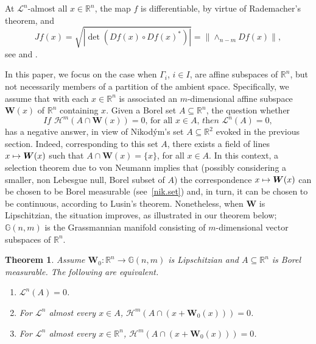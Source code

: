 \documentclass[11pt]{article}
\theoremstyle{definition}
\theoremstyle{jepanonymous}
\theoremstyle{plain}
\newcommand\mto{\mathchoice{\longmapsto}{\mapsto}{\mapsto}{\mapsto}}
\newtheorem*{Theorem*}{Theorem}
\newcommand{\R}{\mathbb{R}}
\newcommand{\Rn}{\R^n}
\newcommand{\calH}{\mathscr{H}}
\newcommand{\calL}{\mathscr{L}}
\newcommand{\bW}{{\boldsymbol{W}}}
\newcommand{\bG}{\mathbb{G}}
\let\subset\subseteq
\begin{document}
At $\calL^n$-almost all $x \in \Rn$, the map $f$ is differentiable, by virtue of Rademacher's theorem, and
\begin{equation*}
Jf(x) = \sqrt{ \left| \det \left(Df(x) \circ Df(x)^*\right)\right|} =\| {\wedge}_{n-m} Df(x)\|,
\end{equation*}
see \cite[Chap.\,3, \S 4]{EVANS.GARIEPY} and \cite[3.2.1 \& 3.2.11]{GMT}.
\par
In this paper, we focus on the case when $\Gamma_i$, $i \in I$, are affine subspaces of $\Rn$, but not necessarily members of a partition of the ambient space.
Specifically, we assume that with each $x \in \Rn$ is associated an $m$-dimensional affine subspace $\bW(x)$ of $\Rn$ containing $x$.
Given a Borel set $A \subset \Rn$, the question whether
\begin{equation}
\label{eq.1}
\textit{If } \calH^m(A \cap \bW(x))=0 \text{, for all } x \in A \textit{, then } \calL^n(A)=0,
\end{equation}
has a negative answer, in view of Nikod\'ym's set $A \subset \R^2$ evoked in the previous section.
Indeed, corresponding to this set $A$, there exists a field of lines $x \mto \bW(x)$ such that $A \cap \bW(x) = \{x\}$, for all $x \in A$.
In this context, a selection theorem due to von Neumann implies that (possibly considering a smaller, non Lebesgue null, Borel subset of $A$) the correspondence $x \mto \bW(x)$ can be chosen to be Borel measurable (see~\ref{nik.set}) and, in turn, it can be chosen to be continuous, according to Lusin's theorem.
Nonetheless, when $\bW$ is Lipschitzian, the situation improves, as illustrated in our theorem below; $\bG(n,m)$ is the Grassmannian manifold consisting of $m$-dimensional vector subspaces of $\Rn$.

\begin{Theorem*}
Assume $\bW_0: \Rn \to \bG(n,m)$ is Lipschitzian and $A \subset \Rn$ is Borel measurable. The following are equivalent.
\begin{enumerate}\renewcommand{\theenumi}{\Alph{enumi}}
\item\label{enum:thA} $\calL^n(A)=0$.
\item\label{enum:thB} For $\calL^n$ almost every $x \in A$, $\calH^m\left(A \cap (x+\bW_0(x))\right)=0$.
\item\label{enum:thC} For $\calL^n$ almost every $x \in \Rn$, $\calH^m\left(A \cap (x+\bW_0(x))\right)=0$.
\end{enumerate}
\end{Theorem*}
\end{document}
